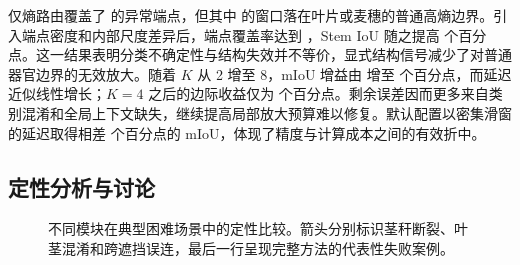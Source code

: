 仅熵路由覆盖了  的异常端点，但其中  的窗口落在叶片或麦穗的普通高熵边界。引入端点密度和内部尺度差异后，端点覆盖率达到 ，Stem IoU 随之提高  个百分点。这一结果表明分类不确定性与结构失效并不等价，显式结构信号减少了对普通器官边界的无效放大。随着 $K$ 从 2 增至 8，mIoU 增益由  增至  个百分点，而延迟近似线性增长；$K=4$ 之后的边际收益仅为  个百分点。剩余误差因而更多来自类别混淆和全局上下文缺失，继续提高局部放大预算难以修复。默认配置以密集滑窗  的延迟取得相差  个百分点的 mIoU，体现了精度与计算成本之间的有效折中。

\subsection{定性分析与讨论}

\begin{figure}[!htbp]
\centering
\caption{不同模块在典型困难场景中的定性比较。箭头分别标识茎秆断裂、叶茎混淆和跨遮挡误连，最后一行呈现完整方法的代表性失败案例。}
\label{fig:qualitative}
\end{figure}

